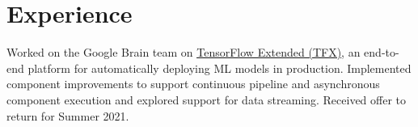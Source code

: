 \documentclass[]{deedy-resume-openfont}
\begin{document}
\hfill
\begin{minipage}[t]{0.66\textwidth} 


\section{Experience}

\sectionsep\sectionsep

\sectionsep\sectionsep


\vspace{\topsep} %
\vspace{1.5pt}
\begin{tightemize}\item Worked on the Google Brain team on \href{https://www.tensorflow.org/tfx}{\uline{TensorFlow Extended (TFX)}}, an end-to-end platform for automatically deploying ML models in production. Implemented component improvements to support continuous pipeline and asynchronous component execution and explored support for data streaming. Received offer to return for Summer 2021.
\end{tightemize}
\sectionsep
\vspace{-0.5pt}



\end{minipage}
\end{document}
